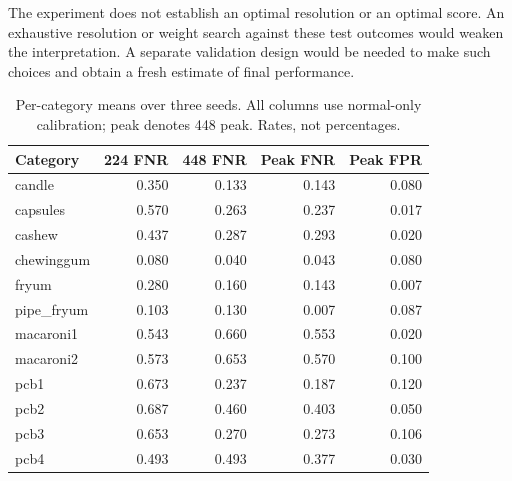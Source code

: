 \documentclass[10pt,twocolumn,letterpaper]{article}
\begin{document}
The experiment does not establish an optimal resolution or an optimal score. An exhaustive resolution or weight search against these test outcomes would weaken the interpretation. A separate validation design would be needed to make such choices and obtain a fresh estimate of final performance.
\begin{table}[h]\centering\scriptsize
\caption{Per-category means over three seeds. All columns use normal-only calibration; peak denotes 448 peak. Rates, not percentages.}
\begin{tabular}{lrrrr}\toprule
Category & 224 FNR & 448 FNR & Peak FNR & Peak FPR\\\midrule
candle & 0.350 & 0.133 & 0.143 & 0.080 \\
capsules & 0.570 & 0.263 & 0.237 & 0.017 \\
cashew & 0.437 & 0.287 & 0.293 & 0.020 \\
chewinggum & 0.080 & 0.040 & 0.043 & 0.080 \\
fryum & 0.280 & 0.160 & 0.143 & 0.007 \\
pipe\_fryum & 0.103 & 0.130 & 0.007 & 0.087 \\
macaroni1 & 0.543 & 0.660 & 0.553 & 0.020 \\
macaroni2 & 0.573 & 0.653 & 0.570 & 0.100 \\
pcb1 & 0.673 & 0.237 & 0.187 & 0.120 \\
pcb2 & 0.687 & 0.460 & 0.403 & 0.050 \\
pcb3 & 0.653 & 0.270 & 0.273 & 0.106 \\
pcb4 & 0.493 & 0.493 & 0.377 & 0.030 \\
\bottomrule\end{tabular}
\end{table}
\end{document}
